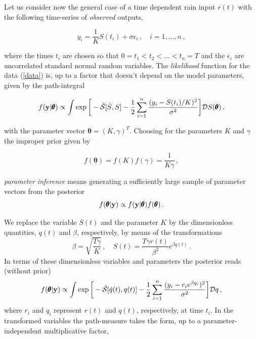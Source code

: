 \documentclass[11pt, a4paper]{article}
\newcommand{\vc}[1]{{\bf #1 }}
\newcommand{\bt}{\pmb\theta}
\begin{document}
\vspace{\baselineskip}

Let us consider now the general case of a time dependent rain input $r(t)$ with the following time-series of {\em observed} outputs,

\begin{equation}\label{data}
  y_i=\frac{1}{K}S(t_i)+\sigma\epsilon_i\,,\quad i=1,\dots,n\,,
\end{equation}

where the times $t_i$ are chosen so that $0=t_1<t_2<\dots < t_n=T$ and the $\epsilon_i$ are uncorrelated standard normal random variables.
The {\em likelihood} function for the data (\ref{data}) is, up to a factor that doesn't depend on the model parameters, given by the path-integral

\begin{equation}\label{likelihood}
  f(\vc y | \bt)
  \propto
  \int
  \exp\bigg[
    -{\tilde{\mathcal S}}[\dot{S},S]
    -\frac{1}{2}
    \sum_{i=1}^n
    \frac
    {(y_i-S(t_i)/K)^2}
    {\sigma^2}
  \bigg]
  {\mathcal D} S(\bt)\,,
\end{equation}

with the parameter vector $\bt=(K,\gamma)^T$. Choosing for the parameters $K$ and $\gamma$ the improper prior given by

\begin{equation}\label{prior}
  f(\bt)
  =  f(K) f(\gamma) = \frac{1}{K \gamma} \,,
\end{equation}

{\em parameter inference} means generating a sufficiently large sample of parameter vectors from the posterior
\begin{equation}\label{posterior}
  f(\bt|\vc y)\propto f(\vc y|\bt)f(\bt)\,.
\end{equation}

We replace the variable $S(t)$ and the parameter $K$ by the dimensionless quantities, $q(t)$ and $\beta$, respectively, by means of the transformations
\begin{equation}
  \beta=\sqrt{\frac{T\gamma}{K}}\,,\quad
  S(t)=\frac{T\gamma r(t)}{\beta^2}e^{\beta q(t)}\,.
\end{equation}
In terms of these dimensionless variables and parameters the posterior reads (without prior)
\begin{equation}\label{posterior_pathint}
  f(\bt | \vc y)
  \propto
  \int
  \exp\bigg[
    -{\tilde{\mathcal S}}[\dot{q}(t),q(t)]
    -\frac{1}{2}
    \sum_{i=1}^n
    \frac
    {(y_i-r_ie^{\beta q_i})^2}
    {\sigma^2}
  \bigg]
  {\mathcal Dq}
  \,,
\end{equation}
where $r_i$ and $q_i$ represent $r(t)$ and $q(t)$, respectively, at time $t_i$. In the transformed variables the path-measure takes the form, up to a parameter-independent multiplicative factor,
\end{document}
